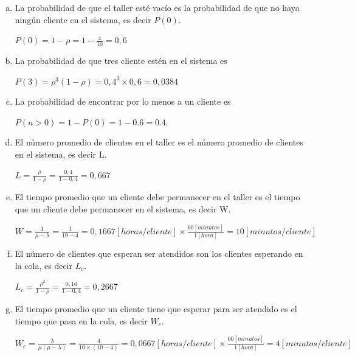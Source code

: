 \documentclass[a4paper,11pt]{article}
\begin{document}
\begin{enumerate}[a)]
  \vspace{13pt}
  \item La probabilidad de que el taller esté vacío es la probabilidad de que
    no haya ningún cliente en el sistema, es decir $P(0)$.

  $P(0) = 1-\rho = 1-\frac{4}{10} = 0,6$

  \vspace{13pt}
  \item La probabilidad de que tres cliente estén en el sistema es

  $P(3) = \rho^3 (1-\rho) = 0,4^3 \times 0,6 = 0,0384$

  \item La probabilidad de encontrar por lo menos a un cliente es

  $P(n > 0) = 1 - P(0) = 1 - 0.6 = 0.4.$

  \vspace{13pt}
  \item El número promedio de clientes en el taller es el número promedio de
    clientes en el sistema, es decir L.

  $L = \frac{\rho}{1-\rho} = \frac{0,4}{1-0,4} = 0,667$

  \vspace{13pt}
  \item El tiempo promedio que un cliente debe permanecer en el taller es el
    tiempo que un cliente debe permanecer en el sistema, es decir W.

  $W = \frac{1}{\mu-\lambda} = \frac{1}{10-4} = 0,1667[horas/cliente] \times
  \frac{60[minutos]}{1[hora]} = 10[minutos/cliente] $

  \vspace{13pt}
  \item El número de clientes que esperan ser atendidos son los clientes
    esperando en la cola, es decir $L_c$.

  $L_c = \frac{\rho^2}{1-\rho} = \frac{0,16}{1-0,4} = 0,2667$

  \vspace{13pt}
  \item El tiempo promedio que un cliente tiene que esperar para ser atendido
    es el tiempo que pasa en la cola, es decir $W_c$.

    $W_c = \frac{\lambda}{\mu(\mu-\lambda)} = \frac{4}{10\times(10-4)} =
    0,0667[horas/cliente] \times \frac{60[minutos]}{1[hora]} =
    4[minutos/cliente]$

\end{enumerate}
\end{document}
